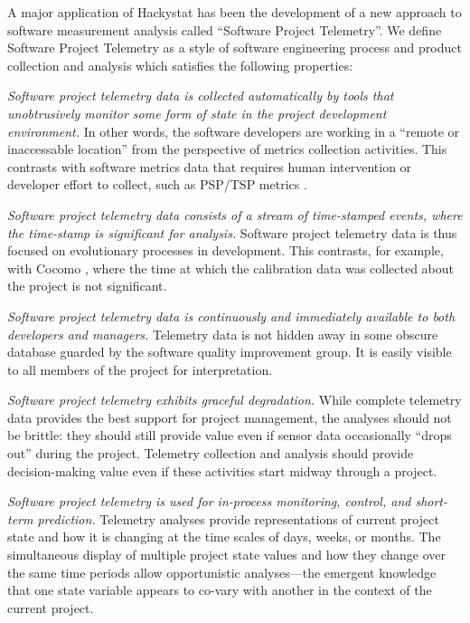 \documentclass[11pt,twocolumn]{article}
\begin{document}

A major application of Hackystat has been the development of a new approach to
software measurement analysis called ``Software Project Telemetry''. We define
Software Project Telemetry as a style of software engineering process and product
collection and analysis  which satisfies
the following properties:

{\em Software project telemetry data is collected automatically by tools
   that unobtrusively monitor some form of state in the project
   development environment.}  In other words, the software developers are
   working in a ``remote or inaccessable location'' from the perspective of
   metrics collection activities. This contrasts with software metrics data
   that requires human intervention or developer effort to collect, such as
   PSP/TSP metrics \cite{Humphrey95}.
        
{\em Software project telemetry data consists of a stream of
   time-stamped events, where the time-stamp is significant for analysis.}
   Software project telemetry data is thus focused on evolutionary
   processes in development.  This contrasts, for example, with Cocomo
   \cite{Boehm81}, where the time at which the calibration data was
   collected about the project is not significant.

{\em Software project telemetry data is continuously and immediately 
available to both developers and managers.}  Telemetry data is not hidden
away in some obscure database guarded by the software quality improvement
group.  It is easily visible to all members of the project for 
interpretation. 

{\em Software project telemetry exhibits graceful degradation.}
While complete telemetry data provides the best support for project
management, the analyses should not be brittle: they should still provide
value even if sensor data occasionally ``drops out'' during the
project. Telemetry collection and analysis should provide decision-making
value even if these activities start midway through a project.
         
{\em Software project telemetry is used for in-process
   monitoring, control, and short-term prediction.} Telemetry analyses
   provide representations of current project state and how it is changing
   at the time scales of days, weeks, or months.  The simultaneous display
   of multiple project state values and how they change over the same time
   periods allow opportunistic analyses---the emergent knowledge that one
   state variable appears to co-vary with another in the context of the
   current project.
\end{document}
